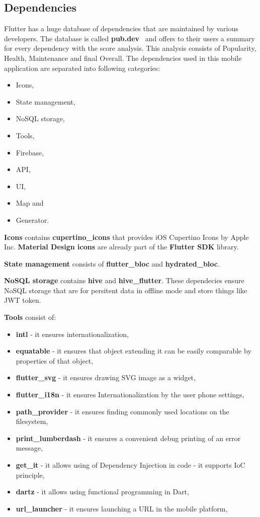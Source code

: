 \subsection{Dependencies}\label{subsec:dependencies}
Flutter has a huge database of dependencies that are maintained by various developers.
The database is called \textbf{pub.dev}~\cite{pubDev} and offers to their users a summary for every dependency with the score analysis.
This analysis consists of Popularity, Health, Maintenance and final Overall.
The dependencies used in this mobile application are separated into following categories:
\begin{itemize}
    \item Icons,
    \item State management,
    \item NoSQL storage,
    \item Tools,
    \item Firebase,
    \item API,
    \item UI,
    \item Map and
    \item Generator.
\end{itemize}

\textbf{Icons} contains \textbf{cupertino\_icons} that provides iOS Cupertino Icons by Apple Inc.
\textbf{Material Design icons} are already part of the \textbf{Flutter SDK} library.

\textbf{State management} consists of \textbf{flutter\_bloc} and \textbf{hydrated\_bloc}.

\textbf{NoSQL storage} contains \textbf{hive} and \textbf{hive\_flutter}.
These dependecies ensure NoSQL storage that are for persitent data in offline mode and store things like JWT token.\cite{jwtToken}

\textbf{Tools} consist of:
\begin{itemize}
    \item \textbf{intl} - it ensures internationalization,
    \item \textbf{equatable} - it ensures that object extending it can be easily comparable by properties of that object,
    \item \textbf{flutter\_svg} - it ensures drawing SVG image as a widget,
    \item \textbf{flutter\_i18n} - it ensures Internationalization by the user phone settings,
    \item \textbf{path\_provider} - it ensures finding commonly used locations on the filesystem,
    \item \textbf{print\_lumberdash} - it ensures a convenient debug printing of an error message,
    \item \textbf{get\_it} - it allows using of Dependency Injection in code - it supports IoC principle,\cite{iocPrinciple}
    \item \textbf{dartz} - it allows using functional programming in Dart,
    \item \textbf{url\_launcher} - it ensures launching a URL in the mobile platform,
\end{itemize}

